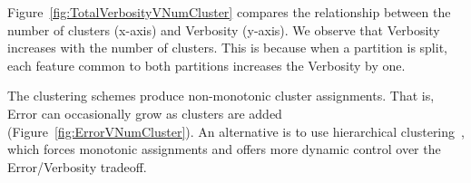
Figure~\ref{fig:TotalVerbosityVNumCluster} compares the relationship between the number of clusters (x-axis) and Verbosity (y-axis).
We observe that Verbosity increases with the number of clusters.
This is because when a partition is split, each feature common to both partitions increases the Verbosity by one.

The clustering schemes produce non-monotonic cluster assignments. That is, Error can occasionally grow as clusters are added (Figure~\ref{fig:ErrorVNumCluster}). 
An alternative is to use hierarchical clustering~\cite{DBLP:journals/prl/Jain10}, which forces monotonic assignments and offers more dynamic control over the Error/Verbosity tradeoff.


